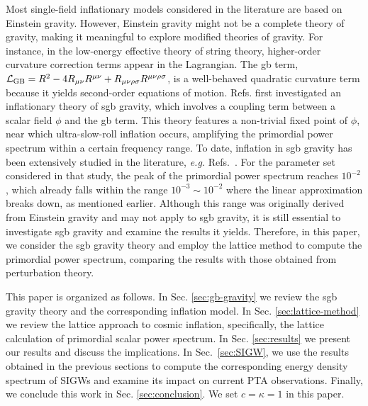 \documentclass[reprint, 10pt, amsmath, amssymb, floatfix, aps, prd, superscriptaddress, nofootinbib, nobibnotes,twocolumn]{revtex4-1}
\begin{document}
Most single-field inflationary models considered in the literature are based on Einstein gravity. However, Einstein gravity might not be a complete theory of gravity, making it meaningful to explore modified theories of gravity. For instance, in the low-energy effective theory of string theory, higher-order curvature correction terms appear in the Lagrangian. The \ac{gb} term, ${\mathcal L}_{\rm GB} = R^2 - 4 R_{\mu\nu}R^{\mu\nu} + R_{\mu\nu\rho\sigma}R^{\mu\nu\rho\sigma}$, is a well-behaved quadratic curvature term because it yields second-order equations of motion. Refs.\cite{Kawai:2021bye,Kawai:2021edk} first investigated an inflationary theory of \ac{sgb} gravity, which involves a coupling term between a scalar field $\phi$ and the \ac{gb} term. This theory features a non-trivial fixed point of $\phi$, near which ultra-slow-roll inflation occurs, amplifying the primordial power spectrum within a certain frequency range. To date, inflation in \ac{sgb} gravity has been extensively studied in the literature, \textit{e.g.} Refs.~\cite{Odintsov:2025wai,Oikonomou:2024etl,Oikonomou:2022xoq,Oikonomou:2021kql,Odintsov:2020zkl,Odintsov:2020sqy,Yogesh:2025hll}. For the parameter set considered in that study, the peak of the primordial power spectrum reaches $10^{-2}$, which already falls within the range $10^{-3} \sim 10^{-2}$ where the linear approximation breaks down, as mentioned earlier. Although this range was originally derived from Einstein gravity and may not apply to \ac{sgb} gravity, it is still essential to investigate \ac{sgb} gravity and examine the results it yields. Therefore, in this paper, we consider the \ac{sgb} gravity theory and employ the lattice method to compute the primordial power spectrum, comparing the results with those obtained from perturbation theory.

This paper is organized as follows. In Sec. \ref{sec:gb-gravity} we review the \ac{sgb} gravity theory and the corresponding inflation model. In Sec. \ref{sec:lattice-method} we review the lattice approach to cosmic inflation, specifically, the lattice calculation of primordial scalar power spectrum. In Sec. \ref{sec:results} we present our results and discuss the implications. In Sec.~\ref{sec:SIGW}, we use the results obtained in the previous sections to compute the corresponding  energy density spectrum of \acp{SIGW} and examine its impact on current \ac{PTA} observations.  Finally, we conclude this work in Sec. \ref{sec:conclusion}. We set $c = \kappa = 1$ in this paper.
\end{document}
